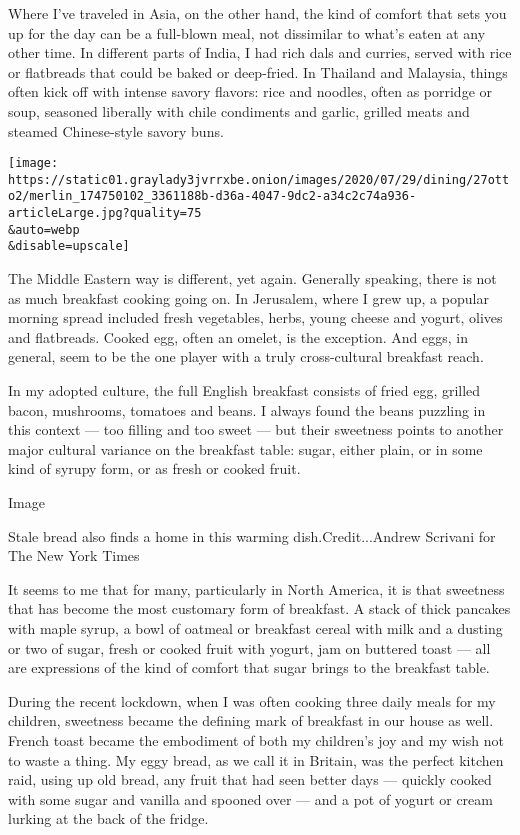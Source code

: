 Where I've traveled in Asia, on the other hand, the kind of comfort that
sets you up for the day can be a full-blown meal, not dissimilar to
what's eaten at any other time. In different parts of India, I had rich
dals and curries, served with rice or flatbreads that could be baked or
deep-fried. In Thailand and Malaysia, things often kick off with intense
savory flavors: rice and noodles, often as porridge or soup, seasoned
liberally with chile condiments and garlic, grilled meats and steamed
Chinese-style savory buns.

\texttt{[image: https://static01.graylady3jvrrxbe.onion/images/2020/07/29/dining/27otto2/merlin\_174750102\_3361188b-d36a-4047-9dc2-a34c2c74a936-articleLarge.jpg?quality=75\\\&auto=webp\\\&disable=upscale]}

The Middle Eastern way is different, yet again. Generally speaking,
there is not as much breakfast cooking going on. In Jerusalem, where I
grew up, a popular morning spread included fresh vegetables, herbs,
young cheese and yogurt, olives and flatbreads. Cooked egg, often an
omelet, is the exception. And eggs, in general, seem to be the one
player with a truly cross-cultural breakfast reach.

In my adopted culture, the full English breakfast consists of fried egg,
grilled bacon, mushrooms, tomatoes and beans. I always found the beans
puzzling in this context --- too filling and too sweet --- but their
sweetness points to another major cultural variance on the breakfast
table: sugar, either plain, or in some kind of syrupy form, or as fresh
or cooked fruit.

Image

Stale bread also finds a home in this warming dish.Credit...Andrew
Scrivani for The New York Times

It seems to me that for many, particularly in North America, it is that
sweetness that has become the most customary form of breakfast. A stack
of thick pancakes with maple syrup, a bowl of oatmeal or breakfast
cereal with milk and a dusting or two of sugar, fresh or cooked fruit
with yogurt, jam on buttered toast --- all are expressions of the kind
of comfort that sugar brings to the breakfast table.

During the recent lockdown, when I was often cooking three daily meals
for my children, sweetness became the defining mark of breakfast in our
house as well. French toast became the embodiment of both my children's
joy and my wish not to waste a thing. My eggy bread, as we call it in
Britain, was the perfect kitchen raid, using up old bread, any fruit
that had seen better days --- quickly cooked with some sugar and vanilla
and spooned over --- and a pot of yogurt or cream lurking at the back of
the fridge.

